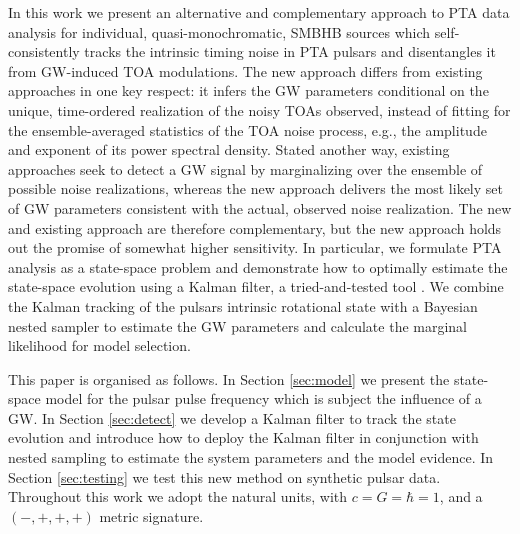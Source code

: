 \documentclass[fleqn,usenatbib,useAMS]{mnras}
\begin{document}
In this work we present an alternative and complementary approach to PTA data analysis for individual, quasi-monochromatic, SMBHB sources which self-consistently tracks the intrinsic timing noise in PTA pulsars and disentangles it from GW-induced TOA modulations. The new approach differs from existing approaches in one key respect: it infers the GW parameters conditional on the unique, time-ordered realization of the noisy TOAs observed, instead of fitting for the ensemble-averaged statistics of the TOA noise process, e.g., the amplitude and exponent of its power spectral density. Stated another way, existing approaches seek to detect a GW signal by marginalizing over the ensemble of possible noise realizations, whereas the new approach delivers the most likely set of GW parameters consistent with the actual, observed noise realization. The new and existing approach are therefore complementary, but the new approach holds out the promise of somewhat higher sensitivity. In particular, we formulate PTA analysis as a state-space problem and demonstrate how to optimally estimate the state-space evolution using a Kalman filter, a tried-and-tested tool \citep{Kalman1,Meyers2021,Melatos2023}. We combine the Kalman tracking of the pulsars intrinsic rotational state with a Bayesian nested sampler \citep{Skilling, Ashton2022} to estimate the GW parameters and calculate the marginal likelihood for model selection. \newline 

\noindent This paper is organised as follows. In Section \ref{sec:model} we present the state-space model for the pulsar pulse frequency which is subject the influence of a GW. In Section \ref{sec:detect} we develop a Kalman filter to track the state evolution and introduce how to deploy the Kalman filter in conjunction with nested sampling to estimate the system parameters and the model evidence. In Section \ref{sec:testing} we test this new method on synthetic pulsar data. Throughout this work we adopt the natural units, with $c = G = \hbar = 1$, and a $(-,+,+,+)$ metric signature. \newline 




%
\end{document}
